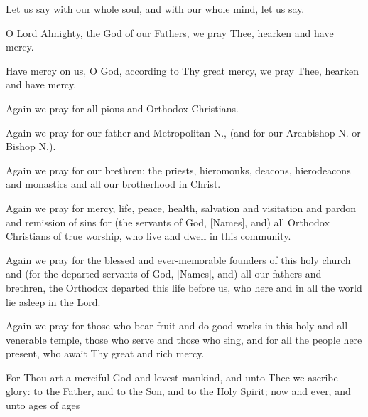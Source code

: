 \documentclass[twoside, letterpaper, 12pt]{report}
\begin{document}
\begin{maybetwocolumns}
\begin{deacon}
\item Let us say with our whole soul, and with our whole mind, let us say.
\end{deacon}

\begin{deacon}
\item O Lord Almighty, the God of our Fathers, we pray Thee, hearken and have mercy.
\end{deacon}

\begin{deacon}
\item Have mercy on us, O God, according to Thy great mercy, we pray Thee, hearken
    and have mercy.
\end{deacon}
\end{maybetwocolumns}

\begin{maybetwocolumns}
\begin{deacon}
\item Again we pray for all pious and Orthodox Christians.
\item Again we pray for our father and Metropolitan N., (and for our Archbishop N. or Bishop N.).
\item Again we pray for our brethren: the priests, hieromonks, deacons, hierodeacons and monastics
    and all our brotherhood in Christ.
\item Again we pray for mercy, life, peace, health, salvation and visitation and pardon and
    remission of sins for (the servants of God, [Names], and) all Orthodox Christians of true
    worship, who live and dwell in this community.
\item Again we pray for the blessed and ever-memorable founders of this holy church and (for
    the departed servants of God, [Names], and) all our fathers and brethren, the Orthodox
    departed this life before us, who here and in all the world lie asleep in the Lord.
\item Again we pray for those who bear fruit and do good works in this holy and all venerable
    temple, those who serve and those who sing, and for all the people here present,
    who await Thy great and rich mercy.
\end{deacon}

\begin{priest}
\item For Thou art a merciful God and lovest mankind, and unto Thee we ascribe glory:
    to the Father, and to the Son, and to the Holy Spirit; now and ever, and unto ages of ages
\end{priest}

\end{maybetwocolumns}
\end{document}

